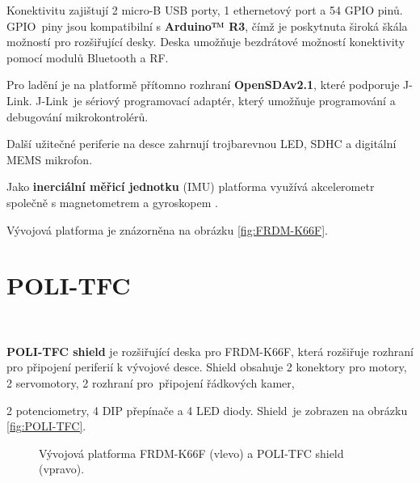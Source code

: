 Konektivitu zajištují 2 micro-B USB porty, 1 ethernetový port a 54 GPIO pinů.
GPIO~piny jsou kompatibilní s \textbf{Arduino™ R3}, čímž je poskytnuta široká škála
možností pro rozšiřující desky. Deska umožňuje bezdrátové možností konektivity
pomocí modulů Bluetooth a RF.

Pro ladění je na platformě přítomno rozhraní \textbf{OpenSDAv2.1}, které podporuje
J-Link. J-Link~je sériový programovací adaptér, který umožňuje programování a
debugování mikrokontrolérů.

Další užitečné periferie na desce zahrnují trojbarevnou LED, SDHC a digitální MEMS
mikrofon.

Jako \textbf{inerciální měřicí jednotku} (IMU) platforma využívá akcelerometr
společně s magnetometrem a gyroskopem \cite{frdmk66UserGuide}.

Vývojová platforma je znázorněna na obrázku \ref{fig:FRDM-K66F}.

\section{POLI-TFC}
\label{sec:POLI-TFC}\

\textbf{POLI-TFC shield} je rozšiřující deska pro FRDM-K66F, která rozšiřuje
rozhraní pro připojení periferií k vývojové desce. Shield obsahuje 2 konektory
pro motory, 2 servomotory, 2 rozhraní pro~připojení řádkových kamer,

2 potenciometry, 4 DIP přepínače a 4 LED diody. Shield~je zobrazen na obrázku
\ref{fig:POLI-TFC}.

\begin{figure}[ht]
	\centering
	\hfill
	\caption{Vývojová platforma FRDM-K66F (vlevo) a POLI-TFC shield (vpravo).}
\end{figure}

\endinput

